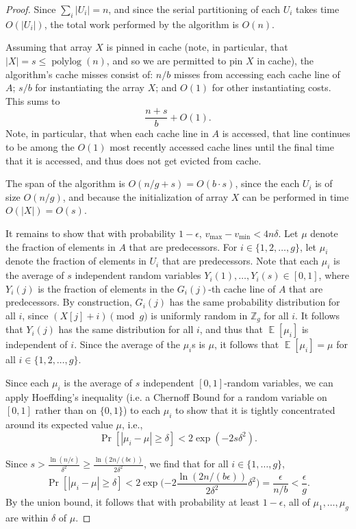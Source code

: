 \documentclass[11pt]{article}
\newcommand{\polylog}{\operatorname{polylog}}
\def\E{\operatorname{\mathbb{E}}}
\theoremstyle{remark}
\theoremstyle{remark}
\begin{document}
\begin{proof}
Since $\sum_i |U_i| = n$, and since the serial partitioning of each $U_i$
takes time $O(|U_i|)$, the total work performed by the algorithm is
$O(n)$.

Assuming that array $X$ is pinned in cache (note, in particular, that
$|X| = s \le \polylog(n)$, and so we are permitted to pin $X$ in
cache), the algorithm's cache misses consist of: $n/b$ misses from
accessing each cache line of $A$; $s/b$ for instantiating the array $X$;
and $O(1)$ for other instantiating costs. This sums
to $$\frac{n+s}{b}+O(1).$$
Note, in particular, that when each cache line in $A$ is accessed, that line continues to be among the $O(1)$ most recently accessed cache lines until the final time that it is accessed, and thus does not get evicted from cache.

The span of the algorithm is $O(n/g + s) = O(b\cdot s)$, since the
each $U_i$ is of size $O(n / g)$, and because the initialization of
array $X$ can be performed in time $O(|X|) = O(s)$.

It remains to show that with probability $1-\epsilon$, $v_{\text{max}}
- v_{\text{min}} < 4n\delta$. Let $\mu$ denote the fraction of
elements in $A$ that are predecessors. For $i \in \{1, 2, \ldots,
g\}$, let $\mu_i$ denote the fraction of elements in $U_i$ that are
predecessors. Note that each $\mu_i$ is the average of $s$ independent
random variables $Y_i(1), \ldots, Y_i(s) \in [0, 1]$, where $Y_i(j)$
is the fraction of elements in the $G_i(j)$-th cache line of $A$ that
are predecessors. By construction, $G_i(j)$ has the same probability
distribution for all $i$, since $(X[j] + i) \pmod g$ is uniformly
random in $\mathbb{Z}_g$ for all $i$. It follows that $Y_i(j)$ has the
same distribution for all $i$, and thus that $\E[\mu_i]$ is
independent of $i$. Since the average of the $\mu_i$s is $\mu$, it
follows that $\E[\mu_i] = \mu$ for all $i \in \{1, 2, \ldots, g\}$.

Since each $\mu_i$ is the average of $s$ independent $[0, 1]$-random
variables, we can apply Hoeffding's inequality (i.e. a Chernoff Bound
for a random variable on $[0,1]$ rather than on $\{0,1\}$) to each
$\mu_i$ to show that it is tightly concentrated around its expected
value $\mu$, i.e.,
$$\Pr[|\mu_i - \mu| \geq \delta] < 2\exp(-2s\delta^2). $$

Since $s > \frac{\ln (n/\epsilon)}{\delta^2} \ge \frac{\ln (2n / (b\epsilon))}{2\delta^2}$, we find that for all $i \in
\{1,\ldots, g\}$,
$$\Pr[|\mu_i - \mu| \geq \delta] < 2\exp\Big({-2} \frac{\ln
  (2n/(b\epsilon))}{2\delta^2} \delta^2\Big) = \frac{\epsilon}{n/b} <
\frac{\epsilon}{g}. $$ By the union bound, it follows that with
probability at least $1 - \epsilon$, all of $\mu_1, \ldots, \mu_{g}$ are within $\delta$ of $\mu$.


\end{proof}
\end{document}
